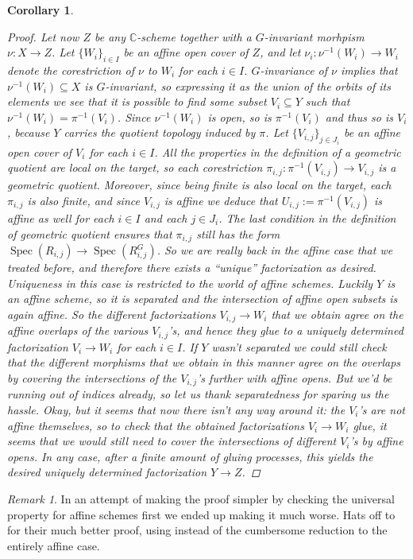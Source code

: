 \documentclass[12pt,a4paper]{amsart}
\theoremstyle{plain}
\newtheorem{cor}[thm]{Corollary}
\theoremstyle{definition}
\theoremstyle{remark}
\newtheorem{rem}[thm]{Remark}
\begin{document}
\begin{cor}
\begin{proof}
    Let now $Z$ be any $\mathbb{C}$-scheme together with a $G$-invariant morhpism $\nu \colon X \to Z$.
    Let $\{ W_{i} \}_{i \in I}$ be an affine open cover of $Z$, and let $\nu_{i} \colon \nu^{-1}(W_{i}) \to W_{i}$ denote the corestriction of $\nu$ to $W_{i}$ for each $i \in I$.
    $G$-invariance of $\nu$ implies that $\nu^{-1}(W_{i}) \subseteq X$ is $G$-invariant, so expressing it as the union of the orbits of its elements we see that it is possible to find some subset $V_{i} \subseteq Y$ such that $\nu^{-1}(W_{i}) = \pi^{-1}(V_{i})$.
    Since $\nu^{-1}(W_{i})$ is open, so is $\pi^{-1}(V_{i})$ and thus so is $V_{i}$, because $Y$ carries the quotient topology induced by $\pi$.
    Let $\{ V_{i,j} \}_{j \in J_{i}}$ be an affine open cover of $V_{i}$ for each $i \in I$.
    All the properties in the definition of a geometric quotient are local on the target, so each corestriction $\pi_{i,j} \colon \pi^{-1}(V_{i,j}) \to V_{i,j}$ is a geometric quotient.
    Moreover, since being finite is also local on the target, each $\pi_{i,j}$ is also finite, and since $V_{i,j}$ is affine we deduce that $U_{i,j} := \pi^{-1}(V_{i,j})$ is affine as well for each $i \in I$ and each $j \in J_{i}$.
    The last condition in the definition of geometric quotient ensures that $\pi_{i,j}$ still has the form $\operatorname{Spec}(R_{i,j}) \to \operatorname{Spec}(R_{i,j}^{G})$.
    So we are really back in the affine case that we treated before, and therefore there exists a ``unique'' factorization as desired.
    Uniqueness in this case is restricted to the world of affine schemes.
    Luckily $Y$ is an affine scheme, so it is separated and the intersection of affine open subsets is again affine.
    So the different factorizations $V_{i,j} \to W_{i}$ that we obtain agree on the affine overlaps of the various $V_{i,j}$'s, and hence they glue to a uniquely determined factorization $V_{i} \to W_{i}$ for each $i \in I$.
    If $Y$ wasn't separated we could still check that the different morphisms that we obtain in this manner agree on the overlaps by covering the intersections of the $V_{i,j}$'s further with affine opens.
    But we'd be running out of indices already, so let us thank separatedness for sparing us the hassle.
    Okay, but it seems that now there isn't any way around it: the $V_{i}$'s are not affine themselves, so to check that the obtained factorizations $V_{i} \to W_{i}$ glue, it seems that we would still need to cover the intersections of different $V_{i}$'s by affine opens.
    In any case, after a finite amount of gluing processes, this yields the desired uniquely determined factorization $Y \to Z$.
  \end{proof}

\end{cor}

\begin{rem}
  In an attempt of making the proof simpler by checking the universal property for affine schemes first we ended up making it much worse.
  Hats off to \cite{mfk94} for their much better proof, using \cite[Exercise II.2.4]{har77} instead of the cumbersome reduction to the entirely affine case.
\end{rem}



\vfill
\end{document}
